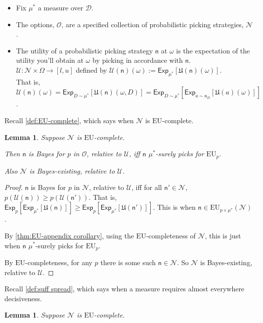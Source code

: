 \documentclass[a4paper]{article}
\newtheorem{lemma}[theorem]{Lemma}
\newcommand\Exp{\mathsf{Exp}}
\newcommand\EU{\mathrm{EU}}
\renewcommand\O{\mathcal{O}}
\newcommand\U{\mathfrak{U}} %
\newcommand\Uwald{\mathcal{U}} %
\newcommand{\D}{\mathcal{D}}
\newcommand{\n}{\mathsf{n}}
\renewcommand{\nu}{\n}
\newcommand\Nu{\mathcal{N}}
\renewcommand{\color}[1]{}
\newenvironment{colored}[1]{\leavevmode\color{#1}}{}
\renewcommand{\geq}{\geqslant}
\newenvironment{CCM rewritten}
{\begingroup\color{blue}} %
{\endgroup}              %
\begin{document}
\begin{colored}{violet}

\begin{itemize}
	\item Fix $\mu^*$ a measure over $\D$. 
\item The options, $\O$, are a specified collection of probabilistic picking strategies, $\Nu$.
\item The utility of a probabilistic picking strategy $\n$ at $\omega$ is the expectation of the utility you'll obtain at $\omega$ by picking in accordance with $\n$.
\\$\Uwald:\Nu\times\Omega\to[l,u]$ defined by $\Uwald(\nu)(\omega):=\Exp_{\mu^*}[\U(\nu)(\omega)]$.
\\That is, $\Uwald(\nu)(\omega)=\Exp_{D\sim \mu^*}[\U(\nu)(\omega,D)]=\Exp_{D\sim \mu^*}[\Exp_{a\sim \nu_D}[\U(a)(\omega)]]$.
\end{itemize}

Recall \cref{def:EU-complete}, which says when $\Nu$ is $\EU$-complete.%
\begin{lemma}\label{thm:cct-appln:existing}
	Suppose $\Nu$ is $\EU$-complete.
	
	Then $\nu$ is Bayes for $p$ in $\O$, relative to $\Uwald$, iff $\nu$ $\mu^*$-surely picks for $\EU_p$. 
	
	Also $\Nu$ is Bayes-existing, relative to $\Uwald$.
\end{lemma}
\begin{proof}
	$\nu$ is Bayes for $p$ in $\Nu$, relative to $\Uwald$, iff
	for all $\nu'\in\Nu$, $p(\Uwald(\nu))\geq p(\Uwald(\nu'))$. That is, $\Exp_p[\Exp_{\mu^*}[\U(\nu)]]\geq \Exp_p[\Exp_{\mu^*}[\U(\nu')]]$. 
	This is when $\nu\in\EU_{p\times\mu^*}(\Nu)$. 
	
	By \cref{thm:EU-appendix corollary}, using the $\EU$-completeness of $\Nu$, this is just when $\nu$ $\mu^*$-surely picks for $\EU_p$.
	
	By $\EU$-completeness, for any $p$ there is some such $\nu\in\Nu$. So $\Nu$ is Bayes-existing, relative to $\Uwald$. 
\end{proof}

Recall \cref{def:suff spread}, which says when a measure requires almost everywhere decisiveness.
\begin{lemma}\label{thm:cct-appln:cts}
	Suppose $\Nu$ is $\EU$-complete. 
	

\end{lemma}
\end{colored}
\end{document}
